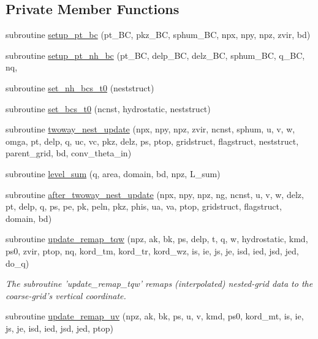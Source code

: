 \subsection*{Private Member Functions}
\begin{DoxyCompactItemize}
\item 
subroutine \hyperlink{classfv__nesting__mod_aeb31ca3ed536c4b9c24be6961e31995f}{setup\-\_\-pt\-\_\-bc} (pt\-\_\-\-B\-C, pkz\-\_\-\-B\-C, sphum\-\_\-\-B\-C, npx, npy, npz, zvir, bd)
\item 
subroutine \hyperlink{classfv__nesting__mod_a0ddf715f18b1c5919a1d36bfa40d2b4f}{setup\-\_\-pt\-\_\-nh\-\_\-bc} (pt\-\_\-\-B\-C, delp\-\_\-\-B\-C, delz\-\_\-\-B\-C, sphum\-\_\-\-B\-C, q\-\_\-\-B\-C, nq,
\item 
subroutine \hyperlink{classfv__nesting__mod_a03568c30a9676d0b68abfc402e154816}{set\-\_\-nh\-\_\-bcs\-\_\-t0} (neststruct)
\item 
subroutine \hyperlink{classfv__nesting__mod_aeca8ba5df19495083e81c0268bf8c8d0}{set\-\_\-bcs\-\_\-t0} (ncnst, hydrostatic, neststruct)
\item 
subroutine \hyperlink{classfv__nesting__mod_a3ee06cf05baeec22674fdc132411e299}{twoway\-\_\-nest\-\_\-update} (npx, npy, npz, zvir, ncnst, sphum, u, v, w, omga, pt, delp, q, uc, vc, pkz, delz, ps, ptop, gridstruct, flagstruct, neststruct, parent\-\_\-grid, bd, conv\-\_\-theta\-\_\-in)
\item 
subroutine \hyperlink{classfv__nesting__mod_abe908820b93fe8dc75b439213d3b699c}{level\-\_\-sum} (q, area, domain, bd, npz, L\-\_\-sum)
\item 
subroutine \hyperlink{classfv__nesting__mod_a6fa54ea0bd54ce56d23b864d37c5b596}{after\-\_\-twoway\-\_\-nest\-\_\-update} (npx, npy, npz, ng, ncnst, u, v, w, delz, pt, delp, q, ps, pe, pk, peln, pkz, phis, ua, va, ptop, gridstruct, flagstruct, domain, bd)
\item 
subroutine \hyperlink{classfv__nesting__mod_a769dacbf0acaa56ddaaa3db3f81bb965}{update\-\_\-remap\-\_\-tqw} (npz, ak, bk, ps, delp, t, q, w, hydrostatic, kmd, ps0, zvir, ptop, nq, kord\-\_\-tm, kord\-\_\-tr, kord\-\_\-wz, is, ie, js, je, isd, ied, jsd, jed, do\-\_\-q)
\begin{DoxyCompactList}\small\item\em The subroutine 'update\-\_\-remap\-\_\-tqw' remaps (interpolated) nested-\/grid data to the coarse-\/grid's vertical coordinate. \end{DoxyCompactList}\item 
subroutine \hyperlink{classfv__nesting__mod_a39990c41c04b8ad7e2dd34b07b5f0f69}{update\-\_\-remap\-\_\-uv} (npz, ak, bk, ps, u, v, kmd, ps0, kord\-\_\-mt, is, ie, js, je, isd, ied, jsd, jed, ptop)
\end{DoxyCompactItemize}



